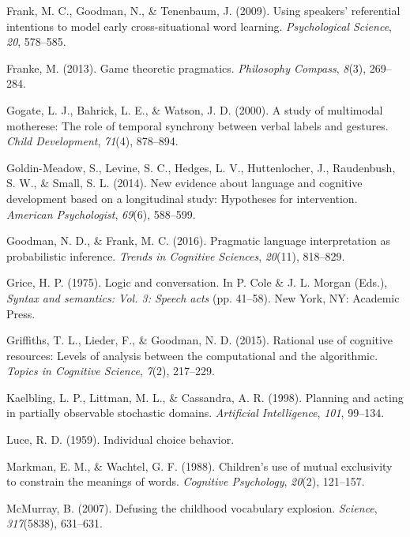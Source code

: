 \documentclass[english,,man,floatsintext]{apa6}
\begin{document}
\leavevmode\hypertarget{ref-frank2009}{}%
Frank, M. C., Goodman, N., \& Tenenbaum, J. (2009). Using speakers' referential intentions to model early cross-situational word learning. \emph{Psychological Science}, \emph{20}, 578--585.

\leavevmode\hypertarget{ref-franke2013}{}%
Franke, M. (2013). Game theoretic pragmatics. \emph{Philosophy Compass}, \emph{8}(3), 269--284.

\leavevmode\hypertarget{ref-gogate2000}{}%
Gogate, L. J., Bahrick, L. E., \& Watson, J. D. (2000). A study of multimodal motherese: The role of temporal synchrony between verbal labels and gestures. \emph{Child Development}, \emph{71}(4), 878--894.

\leavevmode\hypertarget{ref-goldin-meadow2014}{}%
Goldin-Meadow, S., Levine, S. C., Hedges, L. V., Huttenlocher, J., Raudenbush, S. W., \& Small, S. L. (2014). New evidence about language and cognitive development based on a longitudinal study: Hypotheses for intervention. \emph{American Psychologist}, \emph{69}(6), 588--599.

\leavevmode\hypertarget{ref-goodman2016}{}%
Goodman, N. D., \& Frank, M. C. (2016). Pragmatic language interpretation as probabilistic inference. \emph{Trends in Cognitive Sciences}, \emph{20}(11), 818--829.

\leavevmode\hypertarget{ref-grice1975}{}%
Grice, H. P. (1975). Logic and conversation. In P. Cole \& J. L. Morgan (Eds.), \emph{Syntax and semantics: Vol. 3: Speech acts} (pp. 41--58). New York, NY: Academic Press.

\leavevmode\hypertarget{ref-griffiths2015}{}%
Griffiths, T. L., Lieder, F., \& Goodman, N. D. (2015). Rational use of cognitive resources: Levels of analysis between the computational and the algorithmic. \emph{Topics in Cognitive Science}, \emph{7}(2), 217--229.

\leavevmode\hypertarget{ref-kaelbling1998}{}%
Kaelbling, L. P., Littman, M. L., \& Cassandra, A. R. (1998). Planning and acting in partially observable stochastic domains. \emph{Artificial Intelligence}, \emph{101}, 99--134.

\leavevmode\hypertarget{ref-luce1959}{}%
Luce, R. D. (1959). Individual choice behavior.

\leavevmode\hypertarget{ref-markman1988}{}%
Markman, E. M., \& Wachtel, G. F. (1988). Children's use of mutual exclusivity to constrain the meanings of words. \emph{Cognitive Psychology}, \emph{20}(2), 121--157.

\leavevmode\hypertarget{ref-mcmurray2007}{}%
McMurray, B. (2007). Defusing the childhood vocabulary explosion. \emph{Science}, \emph{317}(5838), 631--631.
\end{document}
